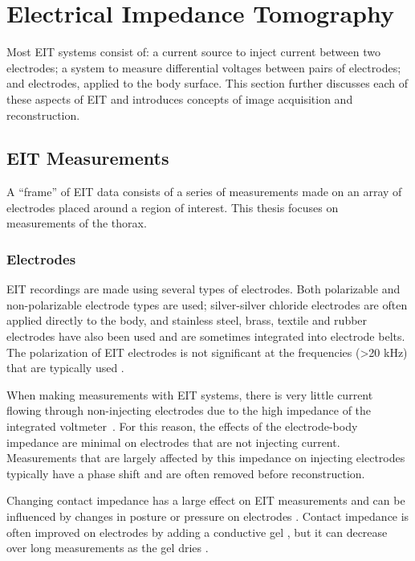 \section{Electrical Impedance Tomography}

Most EIT systems consist of: 
a current source to inject current between two electrodes;
a system to measure differential voltages between pairs of electrodes; and
electrodes, applied to the body surface.
This section further discusses each of these aspects of EIT 
and introduces concepts of image acquisition and reconstruction.


\subsection{EIT Measurements}
A ``frame'' of EIT data consists of a series of measurements made on an array
of electrodes placed around
a region of interest. This thesis focuses on measurements of the thorax. 

\subsubsection{Electrodes} \label{sec:electrodes}

EIT recordings are made using several types of electrodes. 
Both polarizable and non-polarizable
electrode types are used;
silver-silver chloride electrodes are often applied directly to the body,
and stainless steel, brass, textile and rubber electrodes have also 
been used and are sometimes 
integrated into electrode belts. 
The polarization of EIT electrodes is 
not significant at the frequencies (>20 kHz) that are typically used
\parencite{adler_electrical_2017}.

When making measurements with EIT systems, there is very little current flowing
through non-injecting electrodes due to the high impedance of the 
integrated voltmeter~\parencite{holder_electrical_2004}.
For this reason, the effects of the electrode-body impedance 
are minimal on electrodes that are not injecting current. Measurements that 
are largely affected by this impedance on injecting electrodes typically have a
phase shift and are often removed before reconstruction. 

Changing contact impedance has a large effect on EIT measurements 
and can be influenced by changes in posture or pressure on electrodes 
\parencite{coulombe_parametric_2005}.
Contact impedance is often improved on electrodes by adding a
conductive gel \parencite{waldmann_performance_2017}, but it can decrease 
over long measurements as the gel dries \parencite{lozano_errors_1995}. 

